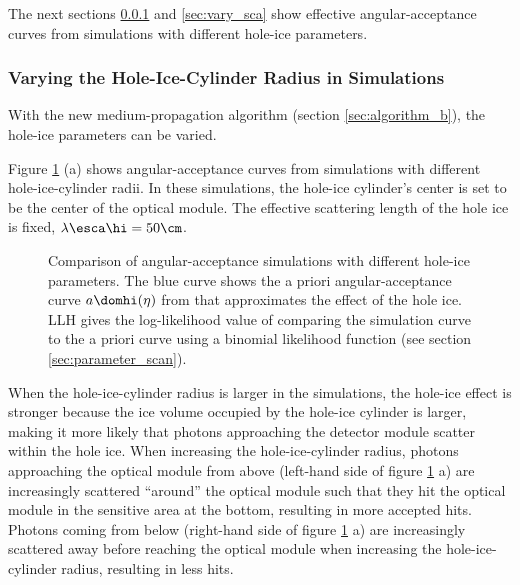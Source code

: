 The next sections \ref{sec:vary_radius} and \ref{sec:vary_sca} show effective angular-acceptance curves from simulations with different hole-ice parameters.


\subsubsection{Varying the Hole-Ice-Cylinder Radius in Simulations}
\label{sec:vary_radius}

With the new medium-propagation algorithm (section \ref{sec:algorithm_b}), the hole-ice parameters can be varied.


Figure \ref{fig:neiyi3Al} (a) shows angular-acceptance curves from simulations with different hole-ice-cylinder radii. In these simulations, the hole-ice cylinder's center is set to be the center of the optical module. The effective scattering length of the hole ice is fixed, $\lambda\esca\hi = 50\cm$.

\begin{figure}[htbp]
  \hfill
  \hfill
  \caption{Comparison of angular-acceptance simulations with different hole-ice parameters. The blue curve shows the a priori angular-acceptance curve $a\domhi(\eta)$ from \cite{icepaper} that approximates the effect of the hole ice. LLH gives the log-likelihood value of comparing the simulation curve to the a priori curve using a binomial likelihood function (see section \ref{sec:parameter_scan}).}
  \label{fig:neiyi3Al}
\end{figure}

When the hole-ice-cylinder radius is larger in the simulations, the hole-ice effect is stronger because the ice volume occupied by the hole-ice cylinder is larger, making it more likely that photons approaching the detector module scatter within the hole ice.
When increasing the hole-ice-cylinder radius, photons approaching the optical module from above (left-hand side of figure \ref{fig:neiyi3Al} a) are increasingly scattered ``around'' the optical module such that they hit the optical module in the sensitive area at the bottom, resulting in more accepted hits.
Photons coming from below (right-hand side of figure \ref{fig:neiyi3Al} a) are increasingly scattered away before reaching the optical module when increasing the hole-ice-cylinder radius, resulting in less hits.


